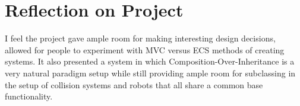 \chapter{Reflection on Project}

I feel the project gave ample room for making interesting design decisions, allowed for people to experiment with MVC versus ECS methods of creating systems. It also presented a system in which Composition-Over-Inheritance is a very natural paradigm setup while still providing ample room for subclassing in the setup of collision systems and robots that all share a common base functionality.